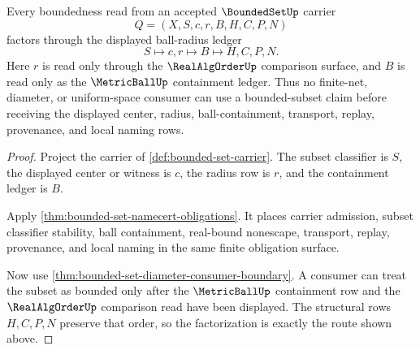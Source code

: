 \begin{theorem}
\label{thm:bounded-set-ball-radius-ledger-factorization}
Every boundedness read from an accepted $\BoundedSetUp$ carrier
$$
Q=(X,S,c,r,B,H,C,P,N)
$$
factors through the displayed ball-radius ledger
$$
S \longmapsto c,r \longmapsto B \longmapsto H,C,P,N .
$$
Here $r$ is read only through the $\RealAlgOrderUp$ comparison surface, and $B$ is read only as the $\MetricBallUp$ containment ledger. Thus no finite-net, diameter, or uniform-space consumer can use a bounded-subset claim before receiving the displayed center, radius, ball-containment, transport, replay, provenance, and local naming rows.
\end{theorem}
\begin{proof}
Project the carrier of \autoref{def:bounded-set-carrier}. The subset classifier is $S$, the displayed center or witness is $c$, the radius row is $r$, and the containment ledger is $B$.

Apply \autoref{thm:bounded-set-namecert-obligations}. It places carrier admission, subset classifier stability, ball containment, real-bound nonescape, transport, replay, provenance, and local naming in the same finite obligation surface.

Now use \autoref{thm:bounded-set-diameter-consumer-boundary}. A consumer can treat the subset as bounded only after the $\MetricBallUp$ containment row and the $\RealAlgOrderUp$ comparison read have been displayed. The structural rows $H,C,P,N$ preserve that order, so the factorization is exactly the route shown above.
\end{proof}

